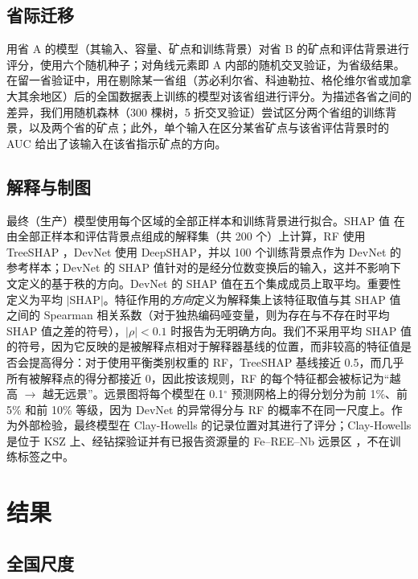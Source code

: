\documentclass[pdflatex,sn-apa]{sn-jnl}
\begin{document}
\subsection{省际迁移}\label{sec:transfer-methods}

用省 A 的模型（其输入、容量、矿点和训练背景）对省 B 的矿点和评估背景进行评分，使用六个随机种子；对角线元素即 A 内部的随机交叉验证，为省级结果。在留一省验证中，用在剔除某一省组（苏必利尔省、科迪勒拉、格伦维尔省或加拿大其余地区）后的全国数据表上训练的模型对该省组进行评分。为描述各省之间的差异，我们用随机森林（300 棵树，5 折交叉验证）尝试区分两个省组的训练背景，以及两个省的矿点；此外，单个输入在区分某省矿点与该省评估背景时的 AUC 给出了该输入在该省指示矿点的方向。

\subsection{解释与制图}\label{sec:shap}

最终（生产）模型使用每个区域的全部正样本和训练背景进行拟合。SHAP 值 \citep{Lundberg2017} 在由全部正样本和评估背景点组成的解释集（共 200 个）上计算，RF 使用 TreeSHAP \citep{Lundberg2020}，DevNet 使用 DeepSHAP，并以 100 个训练背景点作为 DevNet 的参考样本；DevNet 的 SHAP 值针对的是经分位数变换后的输入，这并不影响下文定义的基于秩的方向。DevNet 的 SHAP 值在五个集成成员上取平均。重要性定义为平均 $|$SHAP$|$。特征作用的\emph{方向}定义为解释集上该特征取值与其 SHAP 值之间的 Spearman 相关系数（对于独热编码哑变量，则为存在与不存在时平均 SHAP 值之差的符号），$|\rho| < 0.1$ 时报告为无明确方向。我们不采用平均 SHAP 值的符号，因为它反映的是被解释点相对于解释器基线的位置，而非较高的特征值是否会提高得分：对于使用平衡类别权重的 RF，TreeSHAP 基线接近 0.5，而几乎所有被解释点的得分都接近 0，因此按该规则，RF 的每个特征都会被标记为“越高 $\rightarrow$ 越无远景”。远景图将每个模型在 0.1$^\circ$ 预测网格上的得分划分为前 1\%、前 5\% 和前 10\% 等级，因为 DevNet 的异常得分与 RF 的概率不在同一尺度上。作为外部检验，最终模型在 Clay-Howells 的记录位置对其进行了评分；Clay-Howells 是位于 KSZ 上、经钻探验证并有已报告资源量的 Fe--REE--Nb 远景区 \citep{OGS2011}，不在训练标签之中。

\section{结果}\label{sec:results}

\subsection{全国尺度}\label{sec:res-national}\label{sec:res-ladder}
\end{document}

